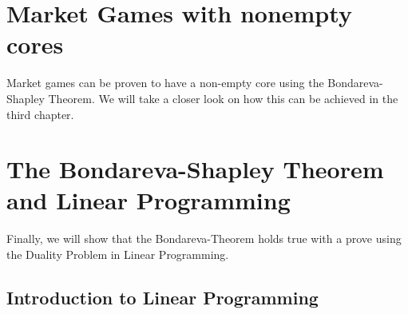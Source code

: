 \documentclass[10pt,a4paper,titlepage]{article}
\theoremstyle{plain}
\theoremstyle{definition}
\begin{document}
\pagebreak
\section{Market Games with nonempty cores}
Market games can be proven to have a non-empty core using the Bondareva-Shapley Theorem. We will take a closer look on how this can be achieved in the third chapter.

\pagebreak
\section{The Bondareva-Shapley Theorem and Linear Programming}
Finally, we will show that the Bondareva-Theorem holds true with a prove using the Duality Problem in Linear Programming.

\subsection{Introduction to Linear Programming}

\pagebreak
 
\printbibliography
\end{document}
